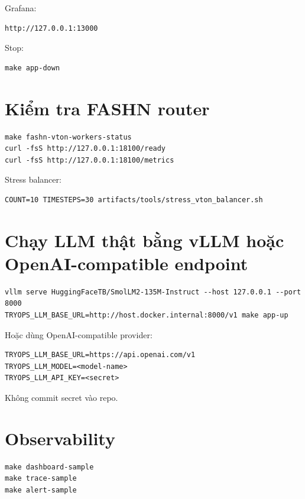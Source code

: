 \documentclass[12pt,a4paper,oneside]{report}
\begin{document}
Grafana:

\begin{lstlisting}
http://127.0.0.1:13000
\end{lstlisting}

Stop:

\begin{lstlisting}
make app-down
\end{lstlisting}

\section{Kiểm tra FASHN router}

\begin{lstlisting}
make fashn-vton-workers-status
curl -fsS http://127.0.0.1:18100/ready
curl -fsS http://127.0.0.1:18100/metrics
\end{lstlisting}

Stress balancer:

\begin{lstlisting}
COUNT=10 TIMESTEPS=30 artifacts/tools/stress_vton_balancer.sh
\end{lstlisting}

\section{Chạy LLM thật bằng vLLM hoặc OpenAI-compatible endpoint}

\begin{lstlisting}
vllm serve HuggingFaceTB/SmolLM2-135M-Instruct --host 127.0.0.1 --port 8000
TRYOPS_LLM_BASE_URL=http://host.docker.internal:8000/v1 make app-up
\end{lstlisting}

Hoặc dùng OpenAI-compatible provider:

\begin{lstlisting}
TRYOPS_LLM_BASE_URL=https://api.openai.com/v1
TRYOPS_LLM_MODEL=<model-name>
TRYOPS_LLM_API_KEY=<secret>
\end{lstlisting}

Không commit secret vào repo.

\section{Observability}

\begin{lstlisting}
make dashboard-sample
make trace-sample
make alert-sample
\end{lstlisting}
\end{document}
